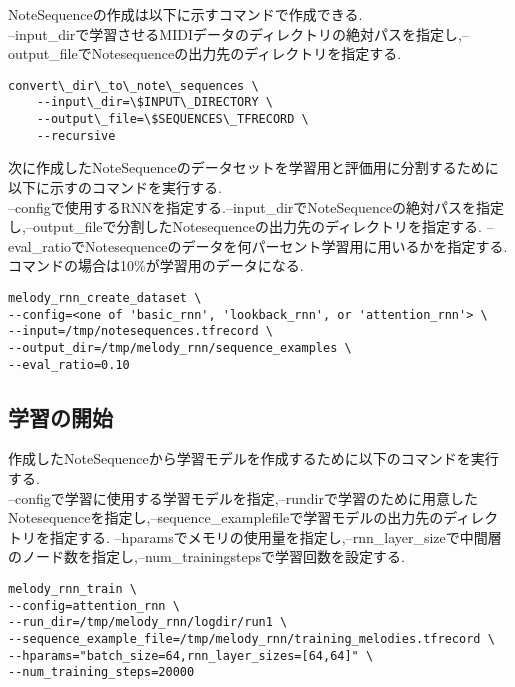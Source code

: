 NoteSequenceの作成は以下に示すコマンドで作成できる.\\
--input\_dirで学習させるMIDIデータのディレクトリの絶対パスを指定し,--output\_fileでNotesequenceの出力先のディレクトリを指定する.\\
\begin{lstlisting}[basicstyle=\ttfamily\footnotesize,frame=single]
    convert\_dir\_to\_note\_sequences \
    --input\_dir=\$INPUT\_DIRECTORY \
    --output\_file=\$SEQUENCES\_TFRECORD \
    --recursive
\end{lstlisting}
次に作成したNoteSequenceのデータセットを学習用と評価用に分割するために以下に示すのコマンドを実行する.\\
--configで使用するRNNを指定する.--input\_dirでNoteSequenceの絶対パスを指定し,--output\_fileで分割したNotesequenceの出力先のディレクトリを指定する.
--eval\_ratioでNotesequenceのデータを何パーセント学習用に用いるかを指定する.コマンドの場合は10\%が学習用のデータになる.
\begin{lstlisting}[basicstyle=\ttfamily\footnotesize,frame=single]
melody_rnn_create_dataset \
--config=<one of 'basic_rnn', 'lookback_rnn', or 'attention_rnn'> \
--input=/tmp/notesequences.tfrecord \
--output_dir=/tmp/melody_rnn/sequence_examples \
--eval_ratio=0.10
\end{lstlisting}
\subsection{学習の開始}
作成したNoteSequenceから学習モデルを作成するために以下のコマンドを実行する.\\
--configで学習に使用する学習モデルを指定,--rundirで学習のために用意したNotesequenceを指定し,--sequence\_examplefileで学習モデルの出力先のディレクトリを指定する.
--hparamsでメモリの使用量を指定し,--rnn\_layer\_sizeで中間層のノード数を指定し,--num\_trainingstepsで学習回数を設定する.\\
\begin{lstlisting}[basicstyle=\ttfamily\footnotesize,frame=single]
melody_rnn_train \
--config=attention_rnn \
--run_dir=/tmp/melody_rnn/logdir/run1 \
--sequence_example_file=/tmp/melody_rnn/training_melodies.tfrecord \
--hparams="batch_size=64,rnn_layer_sizes=[64,64]" \
--num_training_steps=20000
\end{lstlisting}
